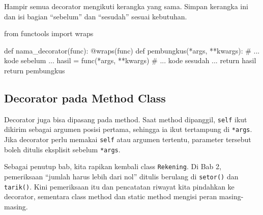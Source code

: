 \begin{info}
Hampir semua decorator mengikuti kerangka yang sama. Simpan kerangka ini dan isi bagian ``sebelum'' dan ``sesudah'' sesuai kebutuhan.
\end{info}

\begin{kode}
from functools import wraps

def nama_decorator(func):
    @wraps(func)
    def pembungkus(*args, **kwargs):
        # ... kode sebelum ...
        hasil = func(*args, **kwargs)
        # ... kode sesudah ...
        return hasil
    return pembungkus
\end{kode}

\subsection{Decorator pada Method Class}

Decorator juga bisa dipasang pada method. Saat method dipanggil, \texttt{self} ikut dikirim sebagai argumen posisi pertama, sehingga ia ikut tertampung di \texttt{*args}. Jika decorator perlu memakai \texttt{self} atau argumen tertentu, parameter tersebut boleh ditulis eksplisit sebelum \texttt{*args}.

Sebagai penutup bab, kita rapikan kembali class \texttt{Rekening}. Di Bab 2, pemeriksaan ``jumlah harus lebih dari nol'' ditulis berulang di \texttt{setor()} dan \texttt{tarik()}. Kini pemeriksaan itu dan pencatatan riwayat kita pindahkan ke decorator, sementara class method dan static method mengisi peran masing-masing.


